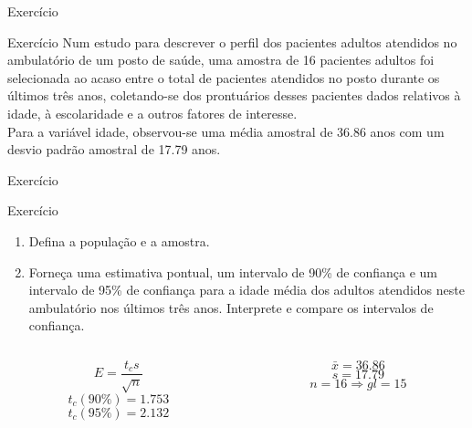 \documentclass{beamer}
\begin{document}
\begin{frame}{Exercício}
  \begin{block}{Exercício}
    Num estudo para descrever o perfil dos pacientes adultos atendidos
    no ambulatório de um posto de saúde, uma amostra de \alert{16}
    pacientes adultos foi selecionada ao acaso entre o total de
    pacientes atendidos no posto durante os últimos três anos,
    coletando-se dos prontuários desses pacientes dados relativos à
    idade, à
    escolaridade e a outros fatores de interesse.\\

    Para a variável idade, observou-se uma média amostral de 36.86
    anos com um desvio padrão amostral de 17.79 anos.    
  \end{block}
\end{frame}

\begin{frame}{Exercício}
  \begin{block}{Exercício}
    \begin{enumerate}
    \item Defina a população e a amostra.
    \item Forneça uma estimativa pontual, um intervalo de 90\% de
      confiança e um intervalo de 95\% de confiança para a idade média
      dos adultos atendidos neste ambulatório nos últimos três
      anos. Interprete e compare os intervalos de confiança.
    \end{enumerate}
  \end{block}

  \begin{block}{}
    \begin{columns}
      \begin{column}{5cm}
    \begin{displaymath}
      E = \frac{t_c s}{\sqrt{n}}
    \end{displaymath}
    \begin{displaymath}
      t_c (90\%) = 1.753
    \end{displaymath}
    \begin{displaymath}
      t_c (95\%) = 2.132
    \end{displaymath}
  \end{column}
  \begin{column}{5cm}
    \begin{displaymath}
      \bar{x} = 36.86
    \end{displaymath}
    \begin{displaymath}
      s = 17.79
    \end{displaymath}
    \begin{displaymath}
      n = 16 \Rightarrow gl = 15
    \end{displaymath}
  \end{column}
\end{columns}
\end{block}
\end{frame}
\end{document}
